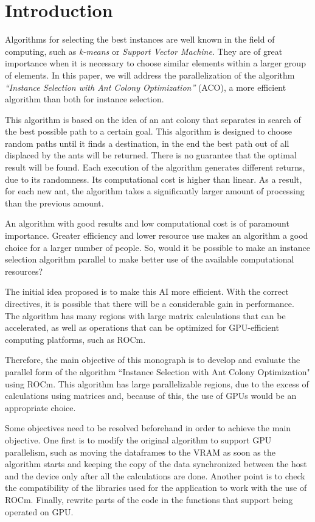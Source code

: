 \section{Introduction}

Algorithms for selecting the best instances are well known in the field of computing, such as \emph{k-means} or \emph{Support Vector Machine}. They are of great importance when it is necessary to choose similar elements within a larger group of elements. In this paper, we will address the parallelization of the algorithm \emph{``Instance Selection with Ant Colony Optimization''} (ACO), a more efficient algorithm than both for instance selection.

This algorithm is based on the idea of an ant colony that separates in search of the best possible path to a certain goal. This algorithm is designed to choose random paths until it finds a destination, in the end the best path out of all displaced by the ants will be returned. There is no guarantee that the optimal result will be found. Each execution of the algorithm generates different returns, due to its randomness. Its computational cost is higher than linear. As a result, for each new ant, the algorithm takes a significantly larger amount of processing than the previous amount.

An algorithm with good results and low computational cost is of paramount importance. Greater efficiency and lower resource use makes an algorithm a good choice for a larger number of people. So, would it be possible to make an instance selection algorithm parallel to make better use of the available computational resources?

The initial idea proposed is to make this AI more efficient. With the correct directives, it is possible that there will be a considerable gain in performance. The algorithm has many regions with large matrix calculations that can be accelerated, as well as operations that can be optimized for GPU-efficient computing platforms, such as ROCm.

Therefore, the main objective of this monograph is to develop and evaluate the parallel form of the algorithm ``Instance Selection with Ant Colony Optimization" using ROCm. This algorithm has large parallelizable regions, due to the excess of calculations using matrices and, because of this, the use of GPUs would be an appropriate choice.

Some objectives need to be resolved beforehand in order to achieve the main objective. One first is to modify the original algorithm to support GPU parallelism, such as moving the dataframes to the VRAM as soon as the algorithm starts and keeping the copy of the data synchronized between the host and the device only after all the calculations are done. Another point is to check the compatibility of the libraries used for the application to work with the use of ROCm. Finally, rewrite parts of the code in the functions that support being operated on GPU.

